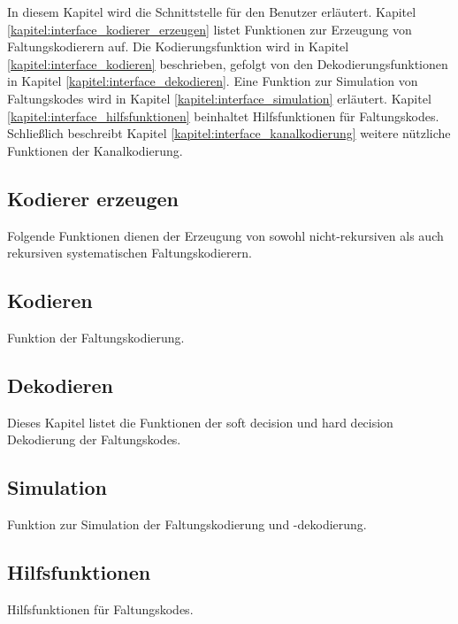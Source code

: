 
In diesem Kapitel wird die Schnittstelle für den Benutzer erläutert. Kapitel \ref{kapitel:interface_kodierer_erzeugen} listet Funktionen zur Erzeugung von Faltungskodierern auf. Die Kodierungsfunktion wird in Kapitel \ref{kapitel:interface_kodieren} beschrieben, gefolgt von den Dekodierungsfunktionen in Kapitel \ref{kapitel:interface_dekodieren}. Eine Funktion zur Simulation von Faltungskodes wird in Kapitel \ref{kapitel:interface_simulation} erläutert. Kapitel \ref{kapitel:interface_hilfsfunktionen} beinhaltet Hilfsfunktionen für Faltungskodes. Schließlich beschreibt Kapitel \ref{kapitel:interface_kanalkodierung} weitere nützliche Funktionen der Kanalkodierung.

\subsection{Kodierer erzeugen}
Folgende Funktionen dienen der Erzeugung von sowohl nicht-rekursiven als auch rekursiven systematischen Faltungskodierern.
\label{kapitel:interface_kodierer_erzeugen}




\subsection{Kodieren}
Funktion der Faltungskodierung.
\label{kapitel:interface_kodieren}


\subsection{Dekodieren}
Dieses Kapitel listet die Funktionen der soft decision und hard decision Dekodierung der Faltungskodes.
\label{kapitel:interface_dekodieren}




\subsection{Simulation}
Funktion zur Simulation der Faltungskodierung und -dekodierung.
\label{kapitel:interface_simulation}


\subsection{Hilfsfunktionen}
Hilfsfunktionen für Faltungskodes.
\label{kapitel:interface_hilfsfunktionen}


